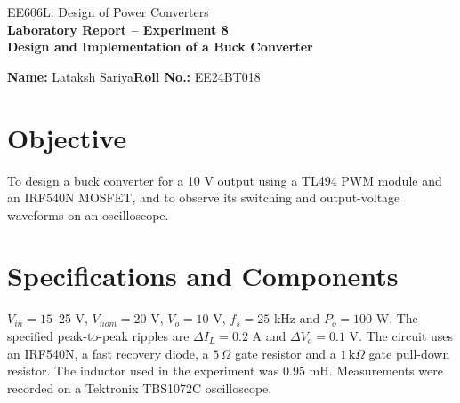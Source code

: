 \documentclass[11pt,a4paper]{article}
\begin{document}
\begin{center}
EE606L: Design of Power Converters\\
{\Large\bfseries Laboratory Report -- Experiment 8}\\[3pt]
{\large\bfseries Design and Implementation of a Buck Converter}
\end{center}
\vspace{3mm}
\textbf{Name:} Lataksh Sariya\hfill\textbf{Roll No.:} EE24BT018

\section{Objective}
To design a buck converter for a 10 V output using a TL494 PWM module and an IRF540N MOSFET, and to observe its switching and output-voltage waveforms on an oscilloscope.

\section{Specifications and Components}
$V_{in}=15$--25 V, $V_{nom}=20$ V, $V_o=10$ V, $f_s=25$ kHz and $P_o=100$ W. The specified peak-to-peak ripples are $\Delta I_L=0.2$ A and $\Delta V_o=0.1$ V. The circuit uses an IRF540N, a fast recovery diode, a $5\,\Omega$ gate resistor and a $1\,\mathrm{k}\Omega$ gate pull-down resistor. The inductor used in the experiment was $0.95$ mH. Measurements were recorded on a Tektronix TBS1072C oscilloscope.
\end{document}
